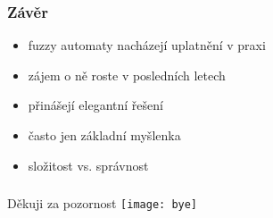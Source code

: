 \documentclass{beamer}
\begin{document}
\begin{frame}	%
\frametitle{Závěr}
\begin{itemize}
	\item fuzzy automaty nacházejí uplatnění v praxi
	\item zájem o ně roste v posledních letech
	\item přinášejí elegantní řešení
	\item často jen základní myšlenka
	\item složitost vs. správnost
\end{itemize}
\end{frame}

\begin{frame}	%
\frametitle{}
\begin{center}
\huge{Děkuji za pozornost}
\vfill
\texttt{[image: bye]}
\end{center}
\end{frame}
\end{document}
